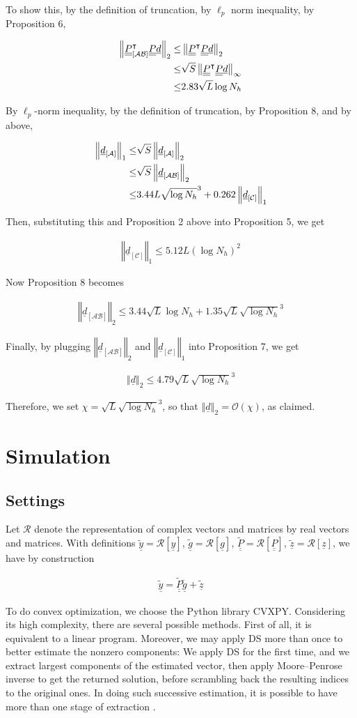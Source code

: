 \documentclass[journal]{IEEEtran}
\newcommand {\m} [1] {\( #1 \)}
\newcommand {\V} [1] {\underline {#1}}
\newcommand {\M} [1] {\underline {\underline {#1}}}
\newcommand {\RB} [1] {\left( #1 \right)}
\newcommand {\SB} [1] {\left[ #1 \right]}
\newcommand {\VNm} [1] {\left \Vert #1 \right \Vert}
\newcommand {\R} [1] {\sqrt {#1}}
\newcommand {\Disp} [1] {
   \begin {align*}
      #1
   \end {align*}
}
\begin{document}
To show this, by the definition of truncation, by \m {\ell_p} norm inequality, by Proposition 6,
\Disp {
\VNm {\M {P} _{\SB {\mathcal {AB}}}^\intercal \M {P} \V {d}} _2
\leq &\VNm {\M {P}^\intercal \M {P} \V {d}} _2 \notag \\
\leq &\R {S} \VNm {\M {P}^\intercal \M {P} \V {d}} _\infty \notag \\
\leq &2.83 \R {L} \log N_h
}
By \m {\ell_p}-norm inequality, by the definition of truncation, by Proposition 8, and by above,
\Disp {
\VNm {\V {d} _{\SB{\mathcal {A}}}} _1
\leq &\R {S} \VNm {\V {d} _{\SB{\mathcal {A}}}} _2 \notag \\
\leq &\R {S} \VNm {\V {d} _{\SB{\mathcal {AB}}}} _2 \notag \\
\leq &3.44 L \R {\log N_h}^3
+0.262 \VNm {\V {d} _{\SB{\mathcal {C}}}} _1
}
Then, substituting this and Proposition 2 above into Proposition 5, we get
\Disp {
\VNm {\V {d} _{\SB{\mathcal {C}}}} _1
\leq 5.12 L \RB {\log N_h}^2
}
Now Proposition 8 becomes
\Disp {
\VNm {\V {d} _{\SB{\mathcal {AB}}}} _2
\leq 3.44 \R {L} \log N_h + 1.35 \R {L} \R {\log N_h} ^3
}
Finally, by plugging \m {\VNm {\V {d} _{\SB{\mathcal {AB}}}} _2} and \m {\VNm {\V {d} _{\SB{\mathcal {C}}}} _1} into Proposition 7, we get
\Disp {
\VNm {\V {d}} _2
\leq 4.79 \R {L} \R {\log N_h}^3
}
Therefore, we set \m {\chi = \R {L} \R {\log N_h}^3}, so that \m {\VNm {\V {d}} _2 = \mathcal {O} \RB {\chi}}, as claimed.



\section{Simulation}

\subsection{Settings}

Let \m {\mathcal {R}} denote the representation of complex vectors and matrices by real vectors and matrices.
With definitions \m {\tilde {\V {y}} = \mathcal {R} \SB {\V {y}}},
\m {\tilde {\V {g}} = \mathcal {R} \SB {\V {g}}},
\m {\tilde {\M {P}} = \mathcal {R} \SB {\M {P}}},
\m {\tilde {\V {z}} = \mathcal {R} \SB {\V {z}}},
we have by construction
%
\Disp {
\V {\tilde {y}}
= \M {\tilde {P}} \V {\tilde {g}} +\V {\tilde {z}} 
}


To do convex optimization, we choose the Python library CVXPY.
Considering its high complexity, there are several possible methods.
First of all, it is equivalent to a linear program.
Moreover, we may apply DS more than once to better estimate the nonzero components:
We apply DS for the first time, and we extract largest components of the estimated vector, then apply Moore–Penrose inverse to get the returned solution, before scrambling back the resulting indices to the original ones.
In doing such successive estimation, it is possible to have more than one stage of extraction \cite {CaT07}.
\end{document}
